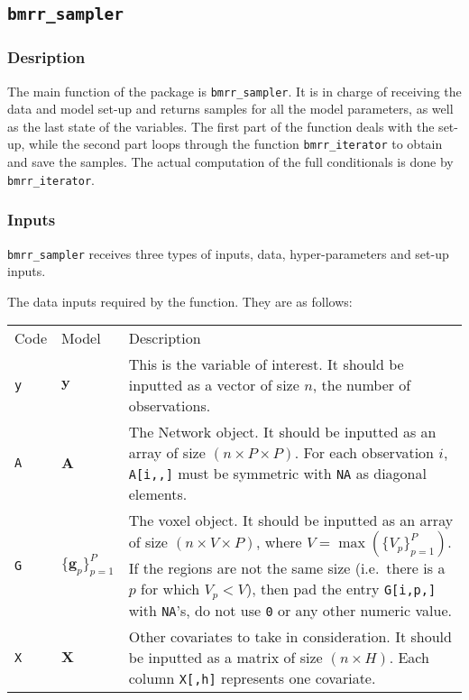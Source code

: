\documentclass[
]{article}
\begin{document}
\subsection{\texorpdfstring{\texttt{bmrr\_sampler}}{bmrr\_sampler}}\label{bmrr_sampler}

\subsubsection{Desription}\label{desription}

The main function of the package is \texttt{bmrr\_sampler}. It is in charge of receiving
the data and model set-up and returns samples for all the model parameters, as
well as the last state of the variables. The first part of the function deals
with the set-up, while the second part loops through the function \texttt{bmrr\_iterator}
to obtain and save the samples. The actual computation of the full conditionals
is done by \texttt{bmrr\_iterator}.

\subsubsection{Inputs}\label{inputs}

\texttt{bmrr\_sampler} receives three types of inputs, data, hyper-parameters and set-up
inputs.

The data inputs required by the function. They are as follows:

\begin{longtable}[]{@{}
  >{\raggedleft\arraybackslash}p{}
  >{\centering\arraybackslash}p{}
  >{\raggedright\arraybackslash}p{}@{}}
\toprule\noalign{}
\endhead
\bottomrule\noalign{}
\endlastfoot
Code & Model & Description \\
\texttt{y} & \( {\boldsymbol y} \) & This is the variable of interest. It should be inputted as a
vector of size \(n\), the number of observations. \\
\texttt{A} & \( {\boldsymbol A} \) & The Network object. It should be inputted as an array of
size \((n \times P \times P)\). For each observation \(i\),
\texttt{A{[}i,,{]}} must be symmetric with \texttt{NA} as diagonal elements. \\
\texttt{G} & \(\{ {\boldsymbol g} _p\}_{p=1}^P\) & The voxel object. It should be inputted as an array
of size \((n \times V \times P)\), where \(V= \max(\{V_p\}_{p=1}^P)\).
If the regions are not the same size (i.e.~there is a \(p\) for
which \(V_p < V\)), then pad the entry \texttt{G{[}i,p,{]}} with \texttt{NA}'s, do not
use \texttt{0} or any other numeric value. \\
\texttt{X} & \( {\boldsymbol X} \) & Other covariates to take in consideration. It should be inputted as
a matrix of size \((n \times H)\). Each column \texttt{X{[},h{]}} represents one
covariate. \\
\end{longtable}
\end{document}
